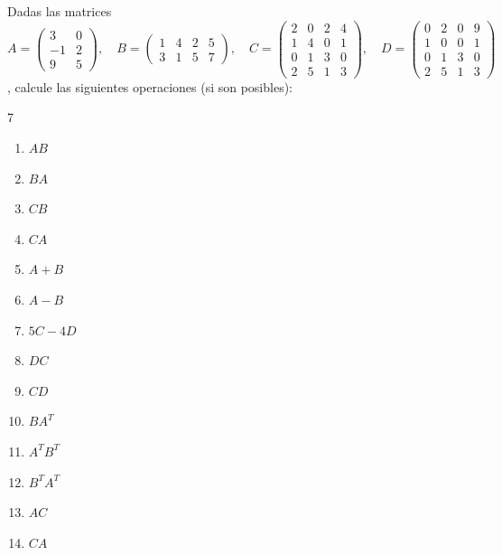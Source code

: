\begin{example}
Dadas las matrices \( A = \begin{pmatrix} 3 & 0 \\ -1 & 2 \\ 9 & 5 \end{pmatrix},\quad
B = \begin{pmatrix} 1 & 4 & 2 & 5 \\ 3 & 1 & 5 & 7 \end{pmatrix},\quad 
C = \begin{pmatrix} 2 & 0 & 2 & 4 \\ 1 & 4 & 0 & 1 \\ 0 & 1 & 3 & 0 \\ 2 & 5 & 1 & 3 \end{pmatrix},\quad 
D = \begin{pmatrix} 0 & 2 & 0 & 9 \\ 1 & 0 & 0 & 1 \\ 0 & 1 & 3 & 0 \\ 2 & 5 & 1 & 3 \end{pmatrix}
\), calcule las siguientes operaciones (si son posibles):
\begin{multicols}{7}
\begin{enumerate}[$(a)$]
    \item $AB$
    \item $BA$
    \item $CB$
    \item $CA$
    \item $A + B$
    \item $A - B$
    \item $5C - 4D$
    \item $DC$
    \item $CD$
    \item $BA^T$
    \item $A^TB^T$
    \item $B^TA^T$
    \item $AC$
    \item $CA$
\end{enumerate}
\end{multicols}


\end{example}
